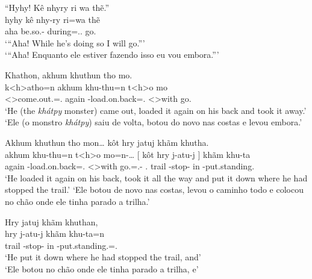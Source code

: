 \documentclass[output=paper,
modfonts,nonflat
]{langsci/langscibook}
\begin{document}
\ea  ``Hyhy! Kê nhyry ri wa thẽ.'' \\[.3em]
\gll hyhy kê     nhy-ry              ri=wa                    thẽ      \\
     aha  \Fut{} be.so.-\Nmlz{} during=\AAnd.\Ds.\First{} go.\Sg{} \\
\glt `{}``Aha! While he's doing so I will go.''{}' \\
     `{}``Aha! Enquanto ele estiver fazendo isso eu vou embora.''{}' \\
\z

\ea  Khathon, akhum khuthun tho mo. \\[.3em]
\gll k<h>atho=n                      akhum khu-thu=n                      t<h>o        mo       \\
     <\Third>come.out.\Sg=\AAnd.\Ss{} again \Third-load.on.back=\AAnd.\Ss{} <\Third>with go.\Pl{} \\
\glt `He (the \textit{khátpy} monster) came out, loaded it again on his back and took it away.' \\
     `Ele (o monstro \textit{khátpy}) saiu de volta, botou do novo nas costas e levou embora.' \\
\z

\largerpage[2]
\ea  Akhum khuthun tho mon\ldots{} kôt hry jatuj khãm khutha. \\[.3em]
\gll akhum khu-thu=n                      t<h>o        mo=n-\ldots{}              [  kôt           hry   j-atu-j         ]  khãm khu-ta                    \\
     again \Third-load.on.back=\AAnd.\Ss{} <\Third>with go.\Pl=\AAnd.\Ss{}-\Ints{} {} \Third.\Erg{} trail \E-stop-\Nmlz{} {} in   \Third-put.standing.\Sg{} \\
\glt `He loaded it again on his back, took it all the way and put it down where he had stopped the trail.' 
\newpage 
     `Ele botou de novo nas costas, levou o caminho todo e colocou no chão onde ele tinha parado a trilha.'  
\z

\ea  Hry jatuj khãm khuthan, \\[.3em]
\gll hry   j-atu-j         khãm khu-ta=n                           \\
     trail \E-stop-\Nmlz{} in   \Third-put.standing.\Sg=\AAnd.\Ss{} \\
\glt `He put it down where he had stopped the trail, and' \\
     `Ele botou no chão onde ele tinha parado a trilha, e' \\
\z
\end{document}
